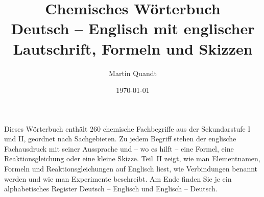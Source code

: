 \title{Chemisches Wörterbuch\\[0.3em] \large Deutsch -- Englisch mit englischer Lautschrift, Formeln und Skizzen}
\author{Martin Quandt}
\date{\today}
\pagestyle{plain}
\setlength{\tabcolsep}{4pt}


\makeatletter
\newcommand\teil{\begingroup\shorthandoff{"}\teil@aux}
\newcommand\teil@aux[3]{\endgroup\part[#1 -- #2]{\raggedright #1\\[5pt]{\normalfont\Large\color{black!55}#2\hspace{0.35em}\penalty0 \ipa{#3}}}}
\newcommand\kapitel{\begingroup\shorthandoff{"}\kapitel@aux}
\newcommand\kapitel@aux[3]{\endgroup\section[#1 -- #2]{\raggedright #1\\[0pt]{\normalfont\small\color{black!55}#2\hspace{0.35em}\penalty0 \ipa{#3}}}}
\newcommand\zwischen{\begingroup\shorthandoff{"}\zwischen@aux}
\newcommand\zwischen@aux[3]{\endgroup\subsection*{\raggedright #1 {\normalfont\small\color{black!55}\,--\, #2\hspace{0.35em}\penalty0 \ipa{#3}}}}
\renewcommand\lies@aux[3]{\endgroup #1 & #2\newline{\color{black!60}#3} \\[1.5pt]}
\makeatother
\setlength{\aboverulesep}{0.15ex}\setlength{\belowrulesep}{0.3ex}\renewcommand{\arraystretch}{0.93}



\maketitle

Dieses Wörterbuch enthält 260 chemische Fachbegriffe aus der Sekundarstufe I und II,
geordnet nach Sachgebieten. Zu jedem Begriff stehen der englische Fachausdruck mit seiner Aussprache und
-- wo es hilft -- eine Formel, eine Reaktionsgleichung oder eine kleine Skizze. Teil~II zeigt, wie man
Elementnamen, Formeln und Reaktionsgleichungen auf Englisch liest, wie Verbindungen benannt werden und
wie man Experimente beschreibt. Am Ende finden Sie je ein alphabetisches Register Deutsch -- Englisch
und Englisch -- Deutsch.

